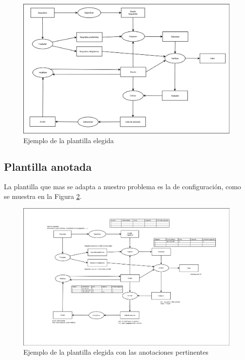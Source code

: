 \begin{figure}[H]
  \centering
  \includegraphics[scale=0.30]{imaxes/PlantillaConfiguracion.png}
  \caption{\label{fig:PlantillaConfiguracion}Ejemplo de la plantilla elegida}
\end{figure}

\subsection{Plantilla anotada}

La plantilla que mas se adapta a nuestro problema es la de configuración, como se muestra en la Figura \ref{fig:PlantillaConfiguracionComentada}.

\begin{figure}[H]
  \centering
  \includegraphics[scale=0.25]{imaxes/PlantillaConfiguracionComentada.png}
  \caption{\label{fig:PlantillaConfiguracionComentada}Ejemplo de la plantilla elegida con las anotaciones pertinentes}
\end{figure}


